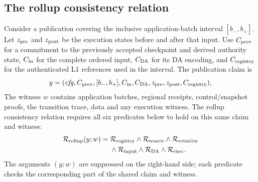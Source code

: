 \documentclass[11pt,a4paper,onecolumn]{article}
\begin{document}
\subsection{The rollup consistency relation}\label{sec:relation}
Consider a publication covering the inclusive application-batch interval
$[b_-,b_+]$. Let $z_{\rm pre}$ and $z_{\rm post}$ be the execution states
before and after that input. Use $C_{\rm prev}$ for a commitment to the
previously accepted checkpoint and derived authority state,
$C_{\rm in}$ for the complete ordered input, $C_{\rm DA}$ for its DA
encoding, and $C_{\rm registry}$ for the authenticated L1 references used
in the interval. The publication claim is
\[
 y=(\mathit{cfg},C_{\rm prev},[b_-,b_+],C_{\rm in},C_{\rm DA},
       z_{\rm pre},z_{\rm post},C_{\rm registry}),
\]
The witness $w$ contains application batches, regional
receipts, control/snapshot proofs, the transition trace, data and any
execution witness. The rollup consistency relation requires all six
predicates below to hold on this same claim and witness:
\[
 \begin{aligned}
 \mathcal R_{\rm rollup}(y;w)={}&
 \mathcal R_{\rm registry}\land\mathcal R_{\rm source}
 \land\mathcal R_{\rm rotation}\\
 &\land\mathcal R_{\rm input}\land\mathcal R_{\rm DA}
 \land\mathcal R_{\rm exec}.
\end{aligned}
\]
The arguments $(y;w)$ are suppressed on the right-hand side; each
predicate checks the corresponding part of the shared claim and witness.
\end{document}
